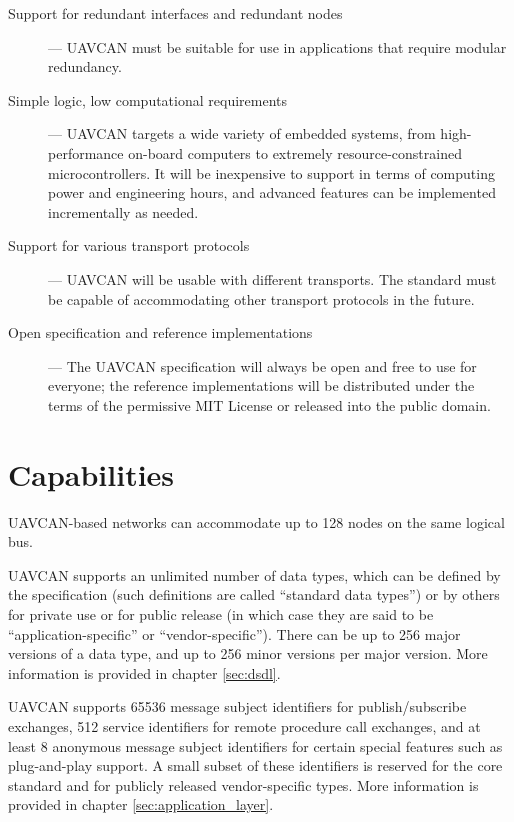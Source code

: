 \begin{description}
    \item[Support for redundant interfaces and redundant nodes] --- UAVCAN must be suitable for use in
    applications that require modular redundancy.

    \item[Simple logic, low computational requirements] --- UAVCAN targets a wide variety of embedded systems,
    from high-performance on-board computers to extremely resource-constrained microcontrollers.
    It will be inexpensive to support in terms of computing power and engineering hours,
    and advanced features can be implemented incrementally as needed.

    \item[Support for various transport protocols] --- UAVCAN will be usable with different transports.
    The standard must be capable of accommodating other transport protocols in the future.

    \item[Open specification and reference implementations] --- The UAVCAN specification will always be open and
    free to use for everyone; the reference implementations will be distributed under the terms of
    the permissive MIT License or released into the public domain.
\end{description}

\section{Capabilities}

UAVCAN-based networks can accommodate up to 128 nodes on the same logical bus.

UAVCAN supports an unlimited number of data types, which can be defined by the specification (such definitions
are called ``standard data types'') or by others for private use or for public release
(in which case they are said to be ``application-specific'' or ``vendor-specific'').
There can be up to 256 major versions of a data type, and up to 256 minor versions per major version.
More information is provided in chapter \ref{sec:dsdl}.

UAVCAN supports 65536 message subject identifiers for publish/subscribe exchanges,
512 service identifiers for remote procedure call exchanges,
and at least 8 anonymous message subject identifiers for certain special features such as plug-and-play support.
A small subset of these identifiers is reserved for the core standard and for publicly released vendor-specific types.
More information is provided in chapter \ref{sec:application_layer}.

